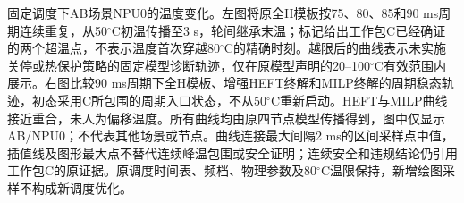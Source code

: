\caption{固定调度下AB场景NPU0的温度变化。左图将原全H模板按75、80、85和90 ms周期连续重复，从50$^\circ$C初温传播至3 s，轮间继承末温；标记给出工作包C已经确证的两个超温点，不表示温度首次穿越80$^\circ$C的精确时刻。越限后的曲线表示未实施关停或热保护策略的固定模型诊断轨迹，仅在原模型声明的20–100$^\circ$C有效范围内展示。右图比较90 ms周期下全H模板、增强HEFT终解和MILP终解的周期稳态轨迹，初态采用C所包围的周期入口状态，不从50$^\circ$C重新启动。HEFT与MILP曲线接近重合，未人为偏移温度。所有曲线均由原四节点模型传播得到，图中仅显示AB/NPU0；不代表其他场景或节点。曲线连接最大间隔2 ms的区间采样点中值，插值线及图形最大点不替代连续峰温包围或安全证明；连续安全和违规结论仍引用工作包C的原证据。原调度时间表、频档、物理参数及80$^\circ$C温限保持，新增绘图采样不构成新调度优化。}
